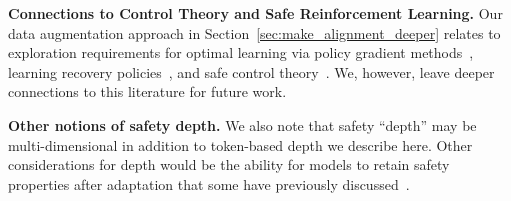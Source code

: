 \textbf{Connections to Control Theory and Safe Reinforcement Learning.} Our data augmentation approach in Section~\ref{sec:make_alignment_deeper} relates to exploration requirements for optimal learning via policy gradient methods~\citep{agarwal2021theory}, learning recovery policies~\citep{thananjeyan2021recovery}, and safe control theory~\citep{burridge1999sequential,ames2019control}. We, however, leave deeper connections to this literature for future work.

\textbf{Other notions of safety depth.} We also note that safety ``depth'' may be multi-dimensional in addition to token-based depth we describe here. Other considerations for depth would be the ability for models to retain safety properties after adaptation that some have previously discussed~\citep{henderson2023self,wei2024assessing,qi2023fine}.